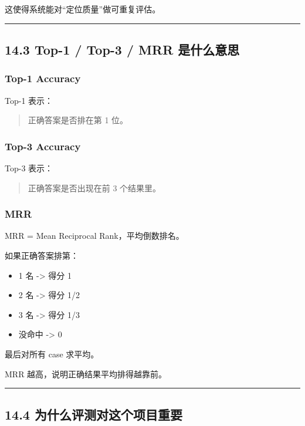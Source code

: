 \documentclass[UTF8,12pt,openany]{ctexbook}
\begin{document}
这使得系统能对“定位质量”做可重复评估。\par

\hrule

\subsection{14.3 Top-1 / Top-3 / MRR 是什么意思}

\subsubsection{Top-1 Accuracy}

Top-1 表示：\par

\begin{quote}
正确答案是否排在第 1 位。
\end{quote}

\subsubsection{Top-3 Accuracy}

Top-3 表示：\par

\begin{quote}
正确答案是否出现在前 3 个结果里。
\end{quote}

\subsubsection{MRR}

MRR = Mean Reciprocal Rank，平均倒数排名。\par

如果正确答案排第：\par

\begin{itemize}
\item 1 名 -> 得分 1
\item 2 名 -> 得分 1/2
\item 3 名 -> 得分 1/3
\item 没命中 -> 0
\end{itemize}

最后对所有 case 求平均。\par

MRR 越高，说明正确结果平均排得越靠前。\par

\hrule

\subsection{14.4 为什么评测对这个项目重要}
\end{document}
